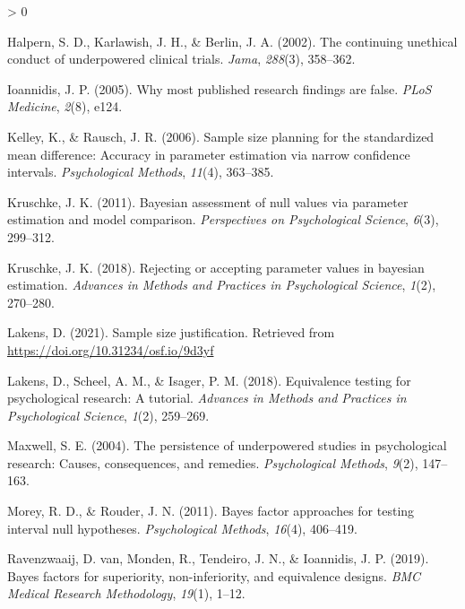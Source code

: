 \documentclass[
  english,
  man,floatsintext]{apa6}
\newlength{\cslhangindent}
\newenvironment{CSLReferences}[2] %
 {%
  \setlength{\parindent}{0pt}
  \ifodd #1 \everypar{\setlength{\hangindent}{\cslhangindent}}\ignorespaces\fi
  \ifnum #2 > 0
  \setlength{\parskip}{#2\baselineskip}
  \fi
 }%
 {}
\begin{document}
\hypertarget{refs}{}
\begin{CSLReferences}{1}{0}
\leavevmode\hypertarget{ref-halpern_continuing_2002}{}%
Halpern, S. D., Karlawish, J. H., \& Berlin, J. A. (2002). The continuing unethical conduct of underpowered clinical trials. \emph{Jama}, \emph{288}(3), 358--362.

\leavevmode\hypertarget{ref-ioannidis_why_2005}{}%
Ioannidis, J. P. (2005). Why most published research findings are false. \emph{{PLoS} Medicine}, \emph{2}(8), e124.

\leavevmode\hypertarget{ref-kelley_sample_2006}{}%
Kelley, K., \& Rausch, J. R. (2006). Sample size planning for the standardized mean difference: Accuracy in parameter estimation via narrow confidence intervals. \emph{Psychological Methods}, \emph{11}(4), 363--385.

\leavevmode\hypertarget{ref-kruschke_bayesian_2011}{}%
Kruschke, J. K. (2011). Bayesian assessment of null values via parameter estimation and model comparison. \emph{Perspectives on Psychological Science}, \emph{6}(3), 299--312.

\leavevmode\hypertarget{ref-kruschke_rejecting_2018}{}%
Kruschke, J. K. (2018). Rejecting or accepting parameter values in bayesian estimation. \emph{Advances in Methods and Practices in Psychological Science}, \emph{1}(2), 270--280.

\leavevmode\hypertarget{ref-lakens_sample_2021}{}%
Lakens, D. (2021). Sample size justification. Retrieved from \url{https://doi.org/10.31234/osf.io/9d3yf}

\leavevmode\hypertarget{ref-lakens_equivalence_2018}{}%
Lakens, D., Scheel, A. M., \& Isager, P. M. (2018). Equivalence testing for psychological research: A tutorial. \emph{Advances in Methods and Practices in Psychological Science}, \emph{1}(2), 259--269.

\leavevmode\hypertarget{ref-maxwell_persistence_2004}{}%
Maxwell, S. E. (2004). The persistence of underpowered studies in psychological research: Causes, consequences, and remedies. \emph{Psychological Methods}, \emph{9}(2), 147--163.

\leavevmode\hypertarget{ref-morey_bayes_2011}{}%
Morey, R. D., \& Rouder, J. N. (2011). Bayes factor approaches for testing interval null hypotheses. \emph{Psychological Methods}, \emph{16}(4), 406--419.

\leavevmode\hypertarget{ref-van_ravenzwaaij_bayes_2019}{}%
Ravenzwaaij, D. van, Monden, R., Tendeiro, J. N., \& Ioannidis, J. P. (2019). Bayes factors for superiority, non-inferiority, and equivalence designs. \emph{{BMC} Medical Research Methodology}, \emph{19}(1), 1--12.


\end{CSLReferences}
\end{document}
